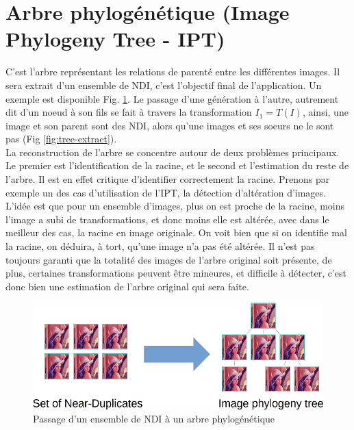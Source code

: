 \documentclass[utf8]{stageM2R} %
\begin{document}
\section{Arbre phylogénétique (Image Phylogeny Tree - IPT)}
C'est l'arbre représentant les relations de parenté entre les différentes images. Il sera extrait d'un ensemble de NDI, c'est l'objectif final de l'application. Un exemple est disponible Fig. \ref{fig:set-to-tree}. Le passage d'une génération à l'autre, autrement dit d'un noeud à son fils se fait à travers la transformation $I_{1} = T(I)$, ainsi, une image et son parent sont des NDI, alors qu'une images et ses soeurs ne le sont pas (Fig \ref{fig:tree-extract}).
\\ \indent
La reconstruction de l'arbre se concentre autour de deux problèmes principaux. Le premier est l'identification de la racine, et le second et l'estimation du reste de l'arbre. Il est en effet critique d'identifier correctement la racine. Prenons par exemple un des cas d'utilisation de l'IPT, la détection d'altération d'images. L'idée est que pour un ensemble d'images, plus on est proche de la racine, moins l'image a subi de transformations, et donc moins elle est altérée, avec dans le meilleur des cas, la racine en image originale. On voit bien que si on identifie mal la racine, on déduira, à tort, qu'une image n'a pas été altérée. Il n'est pas toujours garanti que la totalité des images de l'arbre original soit présente, de plus, certaines transformations peuvent être mineures, et difficile à détecter, c'est donc bien une estimation de l'arbre original qui sera faite.

\begin{figure}
  \begin{center}
    \includegraphics[width=120mm]{images/set_to_tree}
    \caption{Passage d'un ensemble de NDI à un arbre phylogénétique}
    \label{fig:set-to-tree}
  \end{center}
\end{figure}
\end{document}
